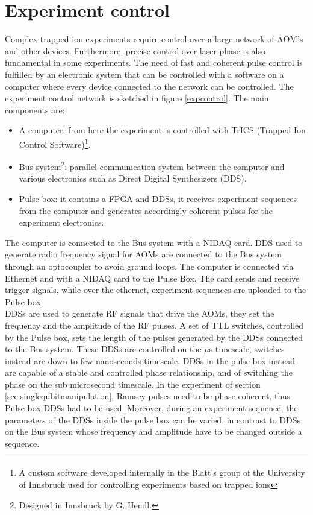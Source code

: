 \section{Experiment control}
\label{sec:expcontrol}
Complex trapped-ion experiments require control over a large network of AOM's and other devices. Furthermore, precise control over laser phase is also fundamental in some experiments. The need of fast and coherent pulse control is fulfilled by an electronic system that can be controlled with a software on a computer where every device connected to the network can be controlled. The experiment control network is sketched in figure \ref{expcontrol}. The main components are:
\begin{itemize}
\item A computer: from here the experiment is controlled with TrICS (Trapped Ion Control Software)\footnote{A custom software developed internally in the Blatt's group of the University of Innsbruck used for controlling experiments based on trapped ions}.
\item Bus system\footnote{Designed in Innsbruck by G. Hendl.}: parallel communication system between the computer and various electronics such as Direct Digital Synthesizers (DDS).
\item Pulse box: it contains a FPGA and DDSs, it receives experiment sequences from the computer and generates accordingly coherent pulses for the experiment electronics.
\end{itemize}
The computer is connected to the Bus system with a NIDAQ card. DDS used to generate radio frequency signal for AOMs are connected to the Bus system through an optocoupler to avoid ground loops. The computer is connected via Ethernet and with a NIDAQ card to the Pulse Box. The card sends and receive trigger signals, while over the ethernet, experiment sequences are uploaded to the Pulse box.\\
DDSs are used to generate RF signals that drive the AOMs, they set the frequency and the amplitude of the RF pulses. A set of TTL switches, controlled by the Pulse box, sets the length of the pulses generated by the DDSs connected to the Bus system. These DDSs are controlled on the $\mu$s timescale, switches instead are down to few nanoseconds timescale. DDSs in the pulse box instead are capable of a stable and controlled phase relationship, and of switching the phase on the sub microsecond timescale. In the experiment of section \ref{sec:singlequbitmanipulation}, Ramsey pulses need to be phase coherent, thus Pulse box DDSs had to be used. Moreover, during an experiment sequence, the parameters of the DDSs inside the pulse box can be varied, in contrast to DDSs on the Bus system whose frequency and amplitude have to be changed outside a sequence.\\
